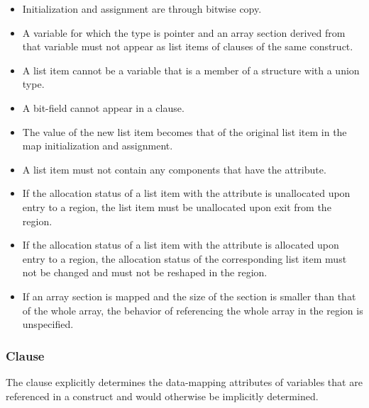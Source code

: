 {{{{\begin{itemize}
\ccppspecificstart
\item Initialization and assignment are through bitwise copy.

\item A variable for which the type is pointer and an array section derived from that variable must not appear as list items of  clauses of the same construct. 

\item A list item cannot be a variable that is a member of a structure with a union type.

\item A bit-field cannot appear in a  clause.
\ccppspecificend
\end{itemize}

\begin{samepage}
\fortranspecificstart
\begin{itemize}
\item The value of the new list item becomes that of the original list item in the map 
initialization and assignment.

\item A list item must not contain any components that have the
   attribute.

\item If the allocation status of a list item with the
   attribute is unallocated upon entry to a
   region, the list item must be unallocated
  upon exit from the region.

\item If the allocation status of a list item with the
   attribute is allocated upon entry to a
   region, the allocation status of the corresponding
  list item must not be changed and must not be reshaped in the
  region.

\item If an array section is mapped and the size of the section is
  smaller than that of the whole array, the behavior of referencing
  the whole array in the  region is unspecified.

\fortranspecificend
\end{itemize}
\end{samepage}





\subsubsection{ Clause}
\label{subsubsec:defaultmap clause}
\summary
The  clause explicitly determines the data-mapping attributes of variables that 
are referenced in a  construct and would otherwise be 
implicitly determined.

}}}}
